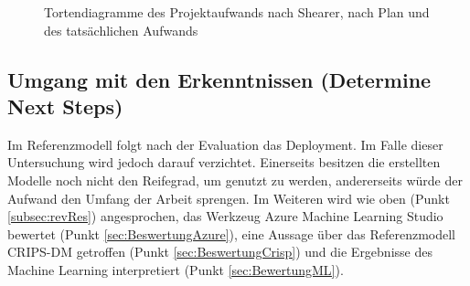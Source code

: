 \begin{figure}[H]
\centering
{}
\caption{Tortendiagramme des Projektaufwands nach Shearer, nach Plan und des tatsächlichen Aufwands}
\label{fig:phases}
\end{figure}

\subsection{Umgang mit den Erkenntnissen (Determine Next Steps)}
Im Referenzmodell folgt nach der Evaluation das Deployment. Im Falle dieser Untersuchung wird jedoch darauf verzichtet. Einerseits besitzen die erstellten Modelle noch nicht den Reifegrad, um genutzt zu werden, andererseits würde der Aufwand den Umfang der Arbeit sprengen.
Im Weiteren wird wie oben (Punkt \ref{subsec:revRes}) angesprochen, das Werkzeug Azure Machine Learning Studio bewertet (Punkt \ref{sec:BeswertungAzure}), eine Aussage über das Referenzmodell CRIPS-DM getroffen (Punkt \ref{sec:BeswertungCrisp}) und die Ergebnisse des Machine Learning interpretiert (Punkt \ref{sec:BewertungML}).




